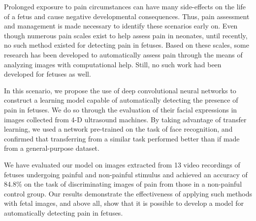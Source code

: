 Prolonged exposure to pain circumstances can have many side-effects on the life of a fetus and cause negative developmental consequences. Thus, pain assessment and management is made necessary to identify these scenarios early on. Even though numerous pain scales exist to help assess pain in neonates, until recently, no such method existed for detecting pain in fetuses. Based on these scales, some research has been developed to automatically assess pain through the means of analyzing images with computational help. Still, no such work had been developed for fetuses as well.

In this scenario, we propose the use of deep convolutional neural networks to construct a learning model capable of automatically detecting the presence of pain in fetuses. We do so through the evaluation of their facial expressions in images collected from 4-D ultrasound machines. By taking advantage of transfer learning, we used a network pre-trained on the task of face recognition, and confirmed that transferring from a similar task performed better than if made from a general-purpose dataset. 

We have evaluated our model on images extracted from 13 video recordings of fetuses undergoing painful and non-painful stimulus and achieved an accuracy of 84.8\% on the task of discriminating images of pain from those in a non-painful control group. Our results demonstrate the effectiveness of applying such methods with fetal images, and above all, show that it is possible to develop a model for automatically detecting pain in fetuses.

